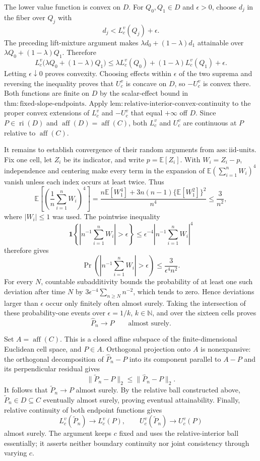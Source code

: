 The lower value function is convex on \(D\).  For \(Q_0,Q_1\in D\) and \(\epsilon>0\), choose \(d_j\) in the fiber over \(Q_j\) with
\[
 d_j<L_c^v(Q_j)+\epsilon.
\]
The preceding lift-mixture argument makes \(\lambda d_0+(1-\lambda)d_1\) attainable over \(\lambda Q_0+(1-\lambda)Q_1\).  Therefore
\[
 L_c^v\bigl(\lambda Q_0+(1-\lambda)Q_1\bigr)
 \le \lambda L_c^v(Q_0)+(1-\lambda)L_c^v(Q_1)+\epsilon.
\]
Letting \(\epsilon\downarrow0\) proves convexity.  Choosing effects within \(\epsilon\) of the two suprema and reversing the inequality proves that \(U_c^v\) is concave on \(D\), so \(-U_c^v\) is convex there.  Both functions are finite on \(D\) by the scalar-effect bound in \(\mathrm{thm{:}fixed\text{-}slope\text{-}endpoints}\).  Apply \(\mathrm{lem{:}relative\text{-}interior\text{-}convex\text{-}continuity}\) to the proper convex extensions of \(L_c^v\) and \(-U_c^v\) that equal \(+\infty\) off \(D\).  Since \(P\in\operatorname{ri}(D)\) and \(\operatorname{aff}(D)=\operatorname{aff}(C)\), both \(L_c^v\) and \(U_c^v\) are continuous at \(P\) relative to \(\operatorname{aff}(C)\).

It remains to establish convergence of their random arguments from \(\mathrm{ass{:}iid\text{-}units}\).  Fix one cell, let \(Z_i\) be its indicator, and write \(p=\mathbb E[Z_i]\).  With \(W_i=Z_i-p\), independence and centering make every term in the expansion of \(\mathbb E(\sum_{i=1}^nW_i)^4\) vanish unless each index occurs at least twice.  Thus
\[
 \mathbb E\left[\left(\frac1n\sum_{i=1}^nW_i\right)^4\right]
 =\frac{n\mathbb E[W_1^4]+3n(n-1)\{\mathbb E[W_1^2]\}^2}{n^4}
 \le\frac{3}{n^2},
\]
where \(|W_i|\le1\) was used.  The pointwise inequality
\[
 \mathbf 1\left\{\left|n^{-1}\sum_{i=1}^nW_i\right|>\epsilon\right\}
 \le \epsilon^{-4}\left|n^{-1}\sum_{i=1}^nW_i\right|^4
\]
therefore gives
\[
 \Pr\left(\left|n^{-1}\sum_{i=1}^nW_i\right|>\epsilon\right)
 \le\frac{3}{\epsilon^4n^2}.
\]
For every \(N\), countable subadditivity bounds the probability of at least one such deviation after time \(N\) by \(3\epsilon^{-4}\sum_{n\ge N}n^{-2}\), which tends to zero.  Hence deviations larger than \(\epsilon\) occur only finitely often almost surely.  Taking the intersection of these probability-one events over \(\epsilon=1/k\), \(k\in\mathbb N\), and over the sixteen cells proves
\[
 \widehat P_n\longrightarrow P\qquad\text{almost surely}.
\]

Set \(A=\operatorname{aff}(C)\).  This is a closed affine subspace of the finite-dimensional Euclidean cell space, and \(P\in A\).  Orthogonal projection onto \(A\) is nonexpansive: the orthogonal decomposition of \(\widehat P_n-P\) into its component parallel to \(A-P\) and its perpendicular residual gives
\[
 \|\widetilde P_n-P\|_2\le\|\widehat P_n-P\|_2.
\]
It follows that \(\widetilde P_n\to P\) almost surely.  By the relative ball constructed above, \(\widetilde P_n\in D\subseteq C\) eventually almost surely, proving eventual attainability.  Finally, relative continuity of both endpoint functions gives
\[
 L_c^v(\widetilde P_n)\longrightarrow L_c^v(P),
 \qquad
 U_c^v(\widetilde P_n)\longrightarrow U_c^v(P)
\]
almost surely.  The argument keeps \(c\) fixed and uses the relative-interior ball essentially; it asserts neither boundary continuity nor joint consistency through varying \(c\).

